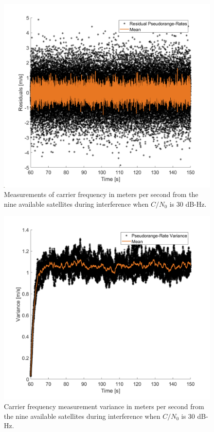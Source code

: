 \documentclass[12pt]{report}
\begin{document}
\begin{figure}[!ht]
  \centering
  \includegraphics[width=0.75\linewidth]{Figures/Results/Scenario1/Case30/carrierFreq.png}
  \caption{Measurements of carrier frequency in meters per second from the nine available satellites during interference when \(C/N_0\) is \(30\) dB-Hz.}\label{fig:carrier30}
\end{figure}

\begin{figure}[!ht]
  \centering
  \includegraphics[width=0.75\linewidth]{Figures/Results/Scenario1/Case30/carrierVariance.png}
  \caption{Carrier frequency measurement variance in meters per second from the nine available satellites during interference when \(C/N_0\) is \(30\) dB-Hz.}\label{fig:carrierVariance30}
\end{figure}
\end{document}
